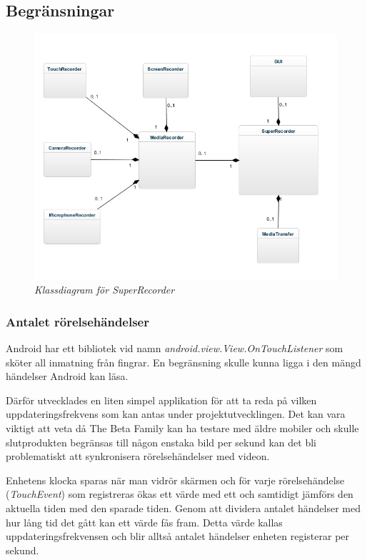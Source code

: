 \subsection{Begränsningar}
\label{subsec:constraints}

\begin{figure}[H]
\centering
\includegraphics[width=\textwidth,height=\textheight,keepaspectratio]{SuperRecorderClassDiagram-diag.jpg}
\caption*{\textit{Klassdiagram för SuperRecorder}}
\label{figure:class}
\end{figure}

\subsubsection{Antalet rörelsehändelser}
\label{touchevents}
Android har ett bibliotek vid namn \emph{android.view.View.OnTouchListener}\parencite{touchlistener} som sköter all inmatning från fingrar. En begränsning skulle kunna ligga i den mängd händelser Android kan läsa. 

Därför utvecklades en liten simpel applikation för att ta reda på vilken uppdateringsfrekvens som kan antas under projektutvecklingen. Det kan vara viktigt att veta då The Beta Family kan ha testare med äldre mobiler och skulle slutprodukten begränsas till någon enstaka bild per sekund kan det bli problematiskt att synkronisera rörelsehändelser med videon.

Enhetens klocka sparas när man vidrör skärmen och för varje rörelsehändelse (\emph{TouchEvent}) som registreras ökas ett värde med ett och samtidigt jämförs den aktuella tiden med den sparade tiden. Genom att dividera antalet händelser med hur lång tid det gått kan ett värde fås fram. Detta värde kallas uppdateringsfrekvensen och blir alltså antalet händelser enheten registerar per sekund.


